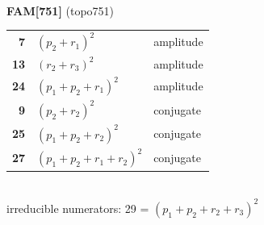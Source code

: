 \documentclass[10pt]{article}
\begin{document}
\begin{minipage}[t]{0.48\textwidth}
{}\\[2mm]\textbf{FAM[751]} (topo751)\\[2pt]{\footnotesize\begin{tabular}{@{}r@{\ \ }l@{\ \ }l@{}}\textbf{7} & $(p_2+r_1)^2$ & amplitude\\
\textbf{13} & $(r_2+r_3)^2$ & amplitude\\
\textbf{24} & $(p_1+p_2+r_1)^2$ & amplitude\\
\textbf{9} & $(p_2+r_2)^2$ & conjugate\\
\textbf{25} & $(p_1+p_2+r_2)^2$ & conjugate\\
\textbf{27} & $(p_1+p_2+r_1+r_2)^2$ & conjugate\\\end{tabular}}\\[2pt]{\scriptsize irreducible numerators: 29 = $(p_1+p_2+r_2+r_3)^2$}\end{minipage}

\bigskip
\end{document}
